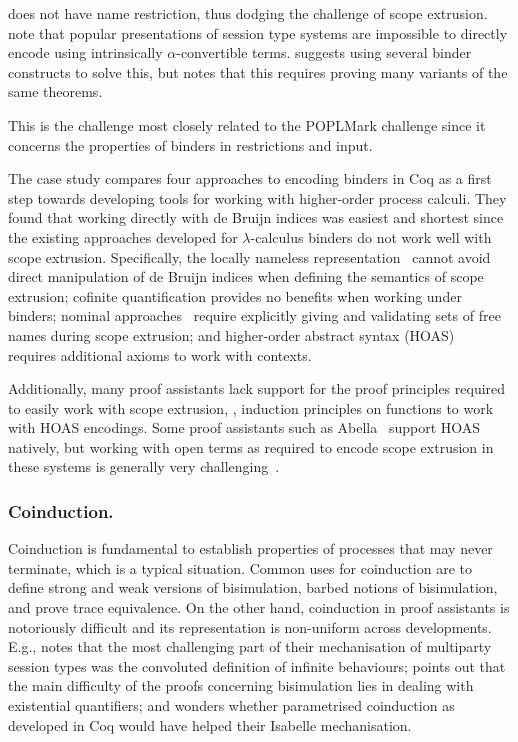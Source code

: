 \documentclass[runningheads]{llncs}
\begin{document}
\cite{Maksimovic2015} does not have name restriction, thus dodging the challenge of scope extrusion.
\cite{Castro-Perez2021,Castro2020} note that popular presentations of session type systems are impossible to directly encode using intrinsically \(\alpha\)-convertible terms.
\cite{Castro2020} suggests using several binder constructs to solve this, but notes that this requires proving many variants of the same theorems.


This is the challenge most closely related to the POPLMark challenge
since it concerns the properties of binders in restrictions and input.

The case study \cite{AmbalLS21} compares four approaches to encoding binders in Coq as a first step towards developing tools for working with higher-order process calculi.
They found that working directly with de Bruijn indices was easiest and shortest since the existing approaches developed for $\lambda$-calculus binders do not work well with scope extrusion.
Specifically, the locally nameless representation~\cite{Chargueraud2012} cannot avoid direct manipulation of de Bruijn indices when defining the semantics of scope extrusion; cofinite quantification provides no benefits when working under binders; nominal approaches~\cite{Pitts2003} require explicitly giving and validating sets of free names during scope extrusion; and higher-order abstract syntax (HOAS)~\cite{Pfenning1988} requires additional axioms to work with contexts.

Additionally, many proof assistants lack support for the proof principles required to easily work with scope extrusion, \ie, induction principles on functions to work with HOAS encodings.
Some proof assistants such as Abella~\cite{Baelde2014} support HOAS natively, but working with open terms as required to encode scope extrusion in these systems is generally very challenging~\cite{Momigliano2012}.

\subsubsection{Coinduction.}
Coinduction is fundamental to establish properties of processes that
may never terminate, which is a typical situation.
Common uses for coinduction are to define strong and weak versions of
bisimulation, barbed notions of bisimulation, and prove trace equivalence.
On the other hand, coinduction in proof assistants
is notoriously difficult and its representation
is non-uniform across developments.
E.g., \cite{Castro-Perez2021} notes that the most challenging
part of their mechanisation of multiparty session types
was the convoluted definition of infinite behaviours;
\cite{Pohjola2022} points out that the main difficulty
of the proofs concerning bisimulation lies
in dealing with existential quantifiers; and
\cite{Bengtson2016} wonders whether parametrised
coinduction as developed in Coq \cite{Hur2013} would
have helped their Isabelle mechanisation.
\end{document}
